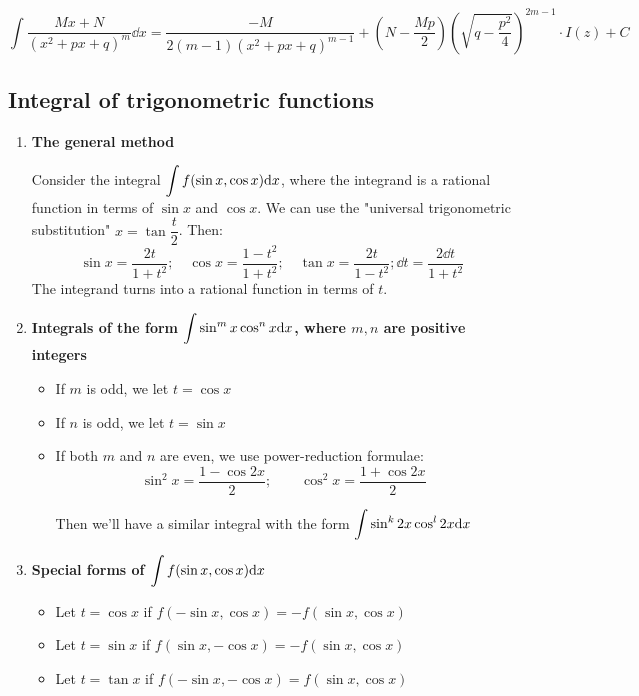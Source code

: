 \documentclass[12pt]{article}
\begin{document}
\begin{equation*}
\int \frac{Mx + N}{(x^2 + px + q)^m} \dd x
= \frac{-M}{2(m - 1)(x^2 + px + q)^{m - 1}} + \left(N - \frac{Mp}{2} \right) \left( \sqrt{q - \dfrac{p^2}{4}}\right)^{2m-1}\cdot I(z) + C
\end{equation*}
\subsection{Integral of trigonometric functions}
\begin{enumerate}
    \item \textbf{The general method}
    \par Consider the integral $\mathlarger{\int f(\sin x, \cos x)\dd x}$, where the integrand is a rational function in terms of $\sin x$ and $\cos x$. We can use the "universal trigonometric substitution" $x = \tan \dfrac{t}{2}$. Then:
    \begin{equation*}
        \sin x = \dfrac{2t}{1+t^2}; \quad \cos x = \dfrac{1-t^2}{1+t^2}; \quad \tan x = \dfrac{2t}{1-t^2}; \dd t = \dfrac{2 \dd t}{1 + t^2}
    \end{equation*}
    The integrand turns into a rational function in terms of $t$.
    \item \textbf{Integrals of the form $\mathlarger{\int \sin ^m x \cos ^n x \dd x}$, where $m,n$ are positive integers}
    \begin{itemize}
        \item If $m$ is odd, we let $t = \cos x$
        \item If $n$ is odd, we let $t = \sin x$
        \item If both $m$ and $n$ are even, we use power-reduction formulae:
        \begin{equation*}
            \sin ^2 x = \dfrac{1-\cos 2x}{2}; \quad \quad \cos ^2 x = \dfrac{1+\cos 2x}{2}
        \end{equation*}
        \par Then we'll have a similar integral with the form $\mathlarger{\int \sin ^k 2x \cos ^l 2x \dd x}$
    \end{itemize}
    \item \textbf{Special forms of $\mathlarger{\int f(\sin x, \cos x) \dd x}$}
    \begin{itemize}
        \item Let $t = \cos x$ if $f(-\sin x, \cos x) = - f(\sin x, \cos x)$
        \item Let $t = \sin x$ if $f(\sin x, -\cos x) = - f(\sin x, \cos x)$
        \item Let $t = \tan x$ if $f(-\sin x, -\cos x) = f(\sin x, \cos x)$
    \end{itemize}
\end{enumerate}
\end{document}

